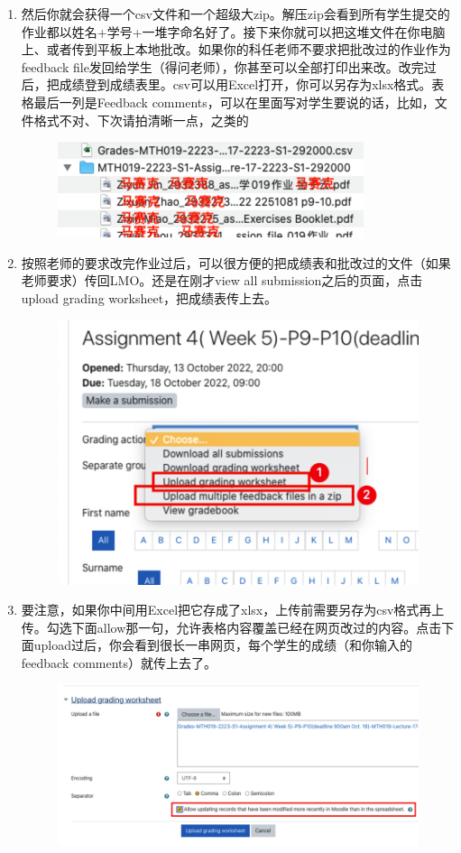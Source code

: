 \begin{enumerate}
\begin{figure}[H]
        \end{figure}
    \item 然后你就会获得一个csv文件和一个超级大zip。解压zip会看到所有学生提交的作业都以姓名+学号+一堆字命名好了。接下来你就可以把这堆文件在你电脑上、或者传到平板上本地批改。如果你的科任老师不要求把批改过的作业作为feedback file发回给学生（得问老师），你甚至可以全部打印出来改。改完过后，把成绩登到成绩表里。csv可以用Excel打开，你可以另存为xlsx格式。表格最后一列是Feedback comments，可以在里面写对学生要说的话，比如，文件格式不对、下次请拍清晰一点，之类的
        \begin{figure}[H]
            \centering
            \includegraphics[width=0.5\columnwidth]{author-folder/Kai.Wu/LMO_Downloaded.png}
        \end{figure}
    \item 按照老师的要求改完作业过后，可以很方便的把成绩表和批改过的文件（如果老师要求）传回LMO。还是在刚才view all submission之后的页面，点击upload grading worksheet，把成绩表传上去。
        \begin{figure}[H]
            \centering
            \includegraphics[width=0.5\columnwidth]{author-folder/Kai.Wu/LMO_upload.png}
        \end{figure}
    \item 要注意，如果你中间用Excel把它存成了xlsx，上传前需要另存为csv格式再上传。勾选下面allow那一句，允许表格内容覆盖已经在网页改过的内容。点击下面upload过后，你会看到很长一串网页，每个学生的成绩（和你输入的feedback comments）就传上去了。
        \begin{figure}[H]
            \centering
            \includegraphics[width=0.8\columnwidth]{author-folder/Kai.Wu/LMO_upload_sheet.png}

\end{figure}
\end{enumerate}
